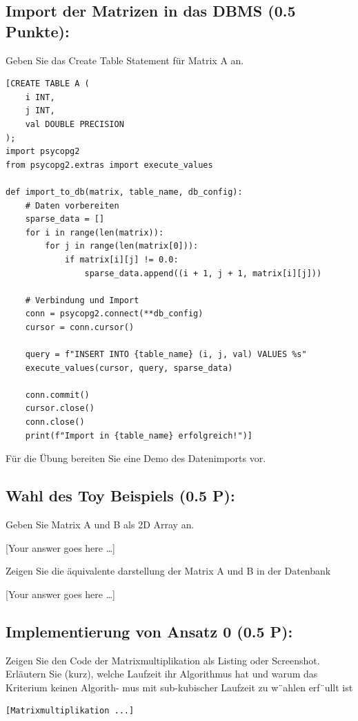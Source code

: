 \documentclass[11pt]{scrartcl}
\newcommand{\youranswerhere}{[Your answer goes here \ldots]}
\begin{document}
\subsection*{Import der Matrizen in das DBMS (0.5 Punkte):}

Geben Sie das Create Table Statement für Matrix A an.

\begin{lstlisting}[style=dmrsql]
[CREATE TABLE A (
    i INT,
    j INT,
    val DOUBLE PRECISION
);
import psycopg2
from psycopg2.extras import execute_values

def import_to_db(matrix, table_name, db_config):
    # Daten vorbereiten
    sparse_data = []
    for i in range(len(matrix)):
        for j in range(len(matrix[0])):
            if matrix[i][j] != 0.0:
                sparse_data.append((i + 1, j + 1, matrix[i][j]))
    
    # Verbindung und Import
    conn = psycopg2.connect(**db_config)
    cursor = conn.cursor()
    
    query = f"INSERT INTO {table_name} (i, j, val) VALUES %s"
    execute_values(cursor, query, sparse_data)
    
    conn.commit()
    cursor.close()
    conn.close()
    print(f"Import in {table_name} erfolgreich!")]
\end{lstlisting}

Für die Übung bereiten Sie eine Demo des Datenimports vor.


\subsection*{Wahl des Toy Beispiels (0.5 P):}

Geben Sie Matrix A und B als 2D Array an.

\youranswerhere{}

Zeigen Sie die äquivalente darstellung der Matrix A und B in der Datenbank

\youranswerhere{}

\subsection*{Implementierung von Ansatz 0 (0.5 P):}
Zeigen Sie den Code der Matrixmultiplikation als Listing oder Screenshot. Erläutern Sie
(kurz), welche Laufzeit ihr Algorithmus hat und warum das Kriterium keinen Algorith-
mus mit sub-kubischer Laufzeit zu w¨ahlen erf¨ullt ist

\begin{lstlisting}[style=dmrsql]
[Matrixmultiplikation ...]
\end{lstlisting}
\end{document}
